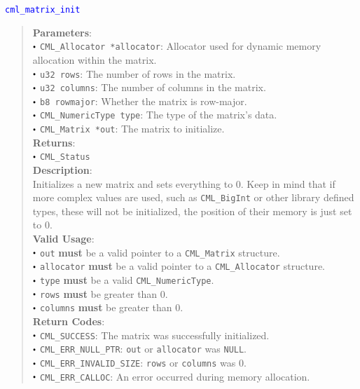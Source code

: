 \documentclass[a4paper,oneside,8pt]{extarticle}
\newcommand{\function}[1]{
  \noindent\textcolor{blue}{\texttt{#1}}
  \vspace{-0.3em}
}
\renewcommand{\dot}{\raisebox{0.3ex}{\scalebox{0.6}{$\bullet$}}}
\theoremstyle{definition}
\begin{document}
\function{cml\_matrix\_init}
\begin{quote}
  \textbf{Parameters}: \\
  $\dot$ \texttt{CML\_Allocator *allocator}: Allocator used for dynamic memory allocation within the matrix. \\
  $\dot$ \texttt{u32 rows}: The number of rows in the matrix. \\
  $\dot$ \texttt{u32 columns}: The number of columns in the matrix. \\
  $\dot$ \texttt{b8 rowmajor}: Whether the matrix is row-major. \\
  $\dot$ \texttt{CML\_NumericType type}: The type of the matrix's data. \\
  $\dot$ \texttt{CML\_Matrix *out}: The matrix to initialize. \\
  \textbf{Returns}: \\
  $\dot$ \texttt{CML\_Status} \\
  
  \vspace{-0.75em}
  \textbf{Description}: \\
  Initializes a new matrix and sets everything to 0. Keep in mind that if more complex values are used, such as \texttt{CML\_BigInt} or other library defined types, these will not be initialized, the position of their memory is just set to 0. \\

  \vspace{-0.75em}
  \textbf{Valid Usage}: \\
  $\dot$ \texttt{out} \textbf{must} be a valid pointer to a \texttt{CML\_Matrix} structure. \\
  $\dot$ \texttt{allocator} \textbf{must} be a valid pointer to a \texttt{CML\_Allocator} structure. \\
  $\dot$ \texttt{type} \textbf{must} be a valid \texttt{CML\_NumericType}. \\
  $\dot$ \texttt{rows} \textbf{must} be greater than 0. \\
  $\dot$ \texttt{columns} \textbf{must} be greater than 0. \\

  \vspace{-0.75em}
  \textbf{Return Codes}: \\
  $\dot$ \texttt{CML\_SUCCESS}: The matrix was successfully initialized. \\
  $\dot$ \texttt{CML\_ERR\_NULL\_PTR}: \texttt{out} or \texttt{allocator} was \texttt{NULL}. \\
  $\dot$ \texttt{CML\_ERR\_INVALID\_SIZE}: \texttt{rows} or \texttt{columns} was 0. \\
  $\dot$ \texttt{CML\_ERR\_CALLOC}: An error occurred during memory allocation. \\
\end{quote}
\end{document}
